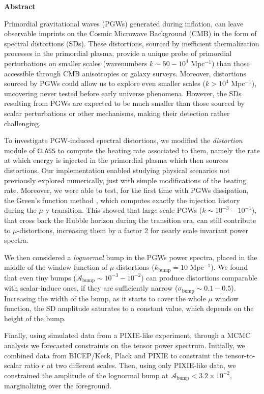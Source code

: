 \vspace*{10pt}
\begin{center}
	\large\textbf{Abstract}\normalsize
\end{center}
\vspace*{10pt}
\begin{adjustwidth}{1cm}{1cm}
Primordial gravitational waves (PGWs) generated during inflation, can leave observable imprints on
the Cosmic Microwave Background (CMB) in the form of spectral distortions (SDs). These distortions,
sourced by inefficient thermalization processes in the primordial plasma, provide a unique probe of
primordial perturbations on smaller scales (wavenumbers $k \sim 50 - 10^{4}$ Mpc$^{-1}$) than those accessible
through CMB anisotropies or galaxy surveys. Moreover, distortions sourced by PGWs could allow us to
explore even smaller scales ($k > 10^{4}$ Mpc$^{-1}$), uncovering never tested before early universe phenomena. However, the SDs resulting from PGWs are expected to be much smaller than those sourced by scalar perturbations or other mechanisms, making their detection rather challenging.

To investigate PGW-induced spectral distortions, we modified the \emph{distortion} module of \texttt{\texttt{CLASS}} to compute the heating rate associated to them, namely the rate at which energy is injected in the primordial plasma which then sources distortions. Our implementation enabled studying physical
scenarios not previously explored numerically, just with simple modifications of the heating rate. Moreover, we were able to test, for the first time with PGWs dissipation, the Green’s function method \cite{Chluba_Green}, which computes exactly the injection history during the $\mu$-y transition. This showed that large scale PGWs ($k\sim 10^{-3}-10^{-1}$), that cross back the Hubble horizon during the transition era, can still contribute to $\mu$-distortions, increasing them by a factor 2 for nearly scale invariant power spectra.

We then considered a \emph{lognormal} bump in the PGWs power spectra, placed in the middle of the window function of $\mu$-distortions ($k_\text{bump}=10$ Mpc$^{-1}$). We found that even tiny bumps ($\mathcal{A}_\text{bump}\sim 10^{-3}-10^{-2}$) can produce distortions comparable with scalar-induce ones, if they are sufficiently narrow ($\sigma_\text{bump}\sim 0.1-0.5$). Increasing the width of the bump, as it starts to cover the whole $\mu$ window function, the SD amplitude saturates to a constant value, which depends on the height of the bump. 

Finally, using simulated data from a PIXIE-like experiment, through a MCMC analysis we forecasted constraints on the tensor power spectrum. Initially, we combined data from BICEP/Keck, Plack and PIXIE to constraint the tensor-to-scalar ratio $r$ at two different scales. Then, using only PIXIE-like data, we constrained the amplitude of the lognormal bump at $\mathcal{A}_\text{bump}<3.2\times10^{-2}$, marginalizing over the foreground.

\end{adjustwidth}